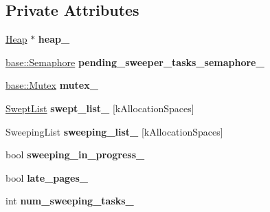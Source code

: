 \subsection*{Private Attributes}
\begin{DoxyCompactItemize}
\item 
\hyperlink{classv8_1_1internal_1_1_heap}{Heap} $\ast$ {\bfseries heap\+\_\+}\hypertarget{classv8_1_1internal_1_1_mark_compact_collector_1_1_sweeper_ab5ec1acc507a54631225c6f32855242b}{}\label{classv8_1_1internal_1_1_mark_compact_collector_1_1_sweeper_ab5ec1acc507a54631225c6f32855242b}

\item 
\hyperlink{classv8_1_1base_1_1_semaphore}{base\+::\+Semaphore} {\bfseries pending\+\_\+sweeper\+\_\+tasks\+\_\+semaphore\+\_\+}\hypertarget{classv8_1_1internal_1_1_mark_compact_collector_1_1_sweeper_ae3cf58676e59276791a2852ee183824b}{}\label{classv8_1_1internal_1_1_mark_compact_collector_1_1_sweeper_ae3cf58676e59276791a2852ee183824b}

\item 
\hyperlink{classv8_1_1base_1_1_mutex}{base\+::\+Mutex} {\bfseries mutex\+\_\+}\hypertarget{classv8_1_1internal_1_1_mark_compact_collector_1_1_sweeper_a0e26df0607d03ff279421b5d97396812}{}\label{classv8_1_1internal_1_1_mark_compact_collector_1_1_sweeper_a0e26df0607d03ff279421b5d97396812}

\item 
\hyperlink{classv8_1_1internal_1_1_list}{Swept\+List} {\bfseries swept\+\_\+list\+\_\+} \mbox{[}k\+Allocation\+Spaces\mbox{]}\hypertarget{classv8_1_1internal_1_1_mark_compact_collector_1_1_sweeper_ab9d3da168b937eb767fd903420c92266}{}\label{classv8_1_1internal_1_1_mark_compact_collector_1_1_sweeper_ab9d3da168b937eb767fd903420c92266}

\item 
Sweeping\+List {\bfseries sweeping\+\_\+list\+\_\+} \mbox{[}k\+Allocation\+Spaces\mbox{]}\hypertarget{classv8_1_1internal_1_1_mark_compact_collector_1_1_sweeper_a45fd2b9c27d942d32d607faffe9134a1}{}\label{classv8_1_1internal_1_1_mark_compact_collector_1_1_sweeper_a45fd2b9c27d942d32d607faffe9134a1}

\item 
bool {\bfseries sweeping\+\_\+in\+\_\+progress\+\_\+}\hypertarget{classv8_1_1internal_1_1_mark_compact_collector_1_1_sweeper_aa6b7eb624c86ee6c5f282bed72714ac1}{}\label{classv8_1_1internal_1_1_mark_compact_collector_1_1_sweeper_aa6b7eb624c86ee6c5f282bed72714ac1}

\item 
bool {\bfseries late\+\_\+pages\+\_\+}\hypertarget{classv8_1_1internal_1_1_mark_compact_collector_1_1_sweeper_a7bebbe4845bf9034ba0c84480efa7aa1}{}\label{classv8_1_1internal_1_1_mark_compact_collector_1_1_sweeper_a7bebbe4845bf9034ba0c84480efa7aa1}

\item 
int {\bfseries num\+\_\+sweeping\+\_\+tasks\+\_\+}\hypertarget{classv8_1_1internal_1_1_mark_compact_collector_1_1_sweeper_a27a7be82091a10217d6cc5c12ac531c0}{}\label{classv8_1_1internal_1_1_mark_compact_collector_1_1_sweeper_a27a7be82091a10217d6cc5c12ac531c0}

\end{DoxyCompactItemize}
